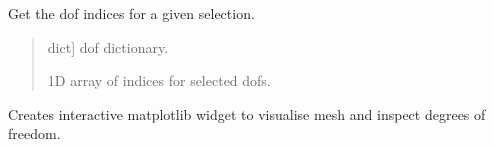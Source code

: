\documentclass[letterpaper,10pt,english]{sphinxmanual}
\begin{document}
\begin{fulllineitems}
\begin{fulllineitems}
\begin{quote}
\begin{description}
\begin{description}
\end{description}

\end{description}\end{quote}

\end{fulllineitems}


\begin{fulllineitems}
\label{\detokenize{model:pywfe.Model.selection_index}}
\pysigstartsignatures
{}
\pysigstopsignatures
\sphinxAtStartPar
Get the dof indices for a given selection.
\begin{quote}\begin{description}
\begin{description}
\sphinxlineitem{\sphinxstylestrong{dof}}{[}dict{]}
\sphinxAtStartPar
dof dictionary.

\end{description}

\begin{description}
\sphinxAtStartPar
1D array of indices for selected dofs.

\end{description}

\end{description}\end{quote}

\end{fulllineitems}


\begin{fulllineitems}
\label{\detokenize{model:pywfe.Model.see}}
\pysigstartsignatures
{}
\pysigstopsignatures
\sphinxAtStartPar
Creates interactive matplotlib widget to visualise mesh and 
inspect degrees of freedom.
\begin{quote}\begin{description}
\begin{description}
\end{description}

\end{description}\end{quote}


\end{fulllineitems}
\end{fulllineitems}
\end{document}
